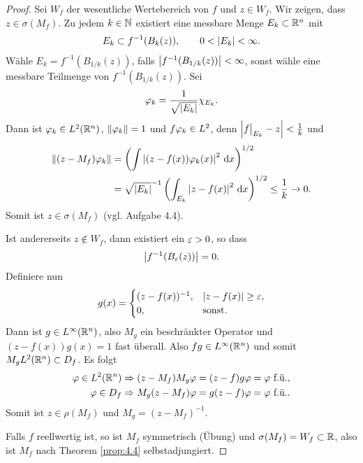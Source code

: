 \begin{proof}
Sei $W_f$ der wesentliche Wertebereich von $f$ und $z\in W_f$. Wir zeigen, dass
$z\in \sigma(M_f)$. Zu jedem $k\in\mathbb{N}$ existiert eine messbare Menge
$E_k\subset\mathbb{R}^n$ mit
\begin{align*}
E_k \subset f^{-1}(B_k(z)),\qquad 0 < \left|E_k\right|< \infty.
\end{align*}
Wähle $E_k = f^{-1}(B_{1/k}(z))$, falls $\left|f^{-1}(B_{1/k}(z))\right| < \infty$,
sonst wähle eine messbare Teilmenge von $f^{-1}(B_{1/k}(z))$. Sei
\begin{align*}
\varphi_k = \frac{1}{\sqrt{\left|E_k\right|}}\chi_{E_k}.
\end{align*}
Dann ist $\varphi_k \in L^2(\mathbb{R}^n)$, $\left\|\varphi_k\right\|=1$ und $f\varphi_k \in L^2$, denn
$\left|f\big|_{E_k}-z\right| < \frac{1}{k}$ und
\begin{align*}
\left\|(z-M_f)\varphi_k\right\| &= \left(\int \left|(z-f(x))\varphi_k(x)\right|^2\,\mathrm{d} x \right)^{1/2}\\
&=
 \sqrt{\left|E_k\right|}^{-1} \left(\int_{E_k} \left|z-f(x)\right|^2\,\mathrm{d} x\right)^{1/2} 
 \le \frac{1}{k}\to 0.
\end{align*}
Somit ist $z\in \sigma(M_f)$ (vgl. Aufgabe 4.4).

Ist andererseits $z\notin W_f$, dann existiert ein $\varepsilon > 0$, so dass
\begin{align*}
\left|f^{-1}(B_\varepsilon(z))\right| = 0.
\end{align*}
Definiere nun
\begin{align*}
g(x) =
\begin{cases}
(z-f(x))^{-1},& \left|z-f(x)\right| \ge \varepsilon,\\
0, & \text{sonst}.
\end{cases}
\end{align*}
Dann ist $g\in L^\infty(\mathbb{R}^n)$, also $M_g$ ein beschränkter Operator und
$(z-f(x))g(x) = 1$ fast überall. Also $fg\in L^\infty(\mathbb{R}^n)$ und somit
$M_gL^2(\mathbb{R}^n)\subset D_f$. Es folgt
\begin{align*}
\varphi\in L^2(\mathbb{R}^n) \Rightarrow
(z-M_f)M_g\varphi = (z-f)g\varphi = \varphi\text{ f.ü.},\\
\varphi\in D_f \Rightarrow M_g(z-M_f)\varphi = g(z-f)\varphi = \varphi\text{ f.ü.}.
\end{align*}
Somit ist $z\in \rho(M_f)$ und $M_g=(z-M_f)^{-1}$.

Falls $f$ reellwertig ist, so ist $M_f$ symmetrisch (Übung) und $\sigma(M_f) =
W_f \subset\mathbb{R}$, also ist $M_f$ nach Theorem \ref{prop:4.4}
selbstadjungiert.\qedhere
\end{proof}

